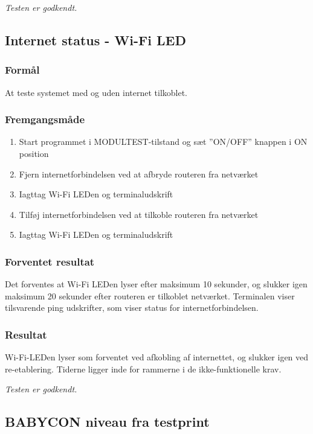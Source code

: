 
\textit{Testen er godkendt.}

\subsection*{Internet status - Wi-Fi LED}

\subsubsection*{Formål}
At teste systemet med og uden internet tilkoblet.

\subsubsection*{Fremgangsmåde}
\begin{enumerate}
\item Start programmet i MODULTEST-tilstand og sæt ''ON/OFF'' knappen i ON position
\item Fjern internetforbindelsen ved at afbryde routeren fra netværket
\item Iagttag Wi-Fi LEDen og terminaludskrift
\item Tilføj internetforbindelsen ved at tilkoble routeren fra netværket
\item Iagttag Wi-Fi LEDen og terminaludskrift
\end{enumerate}

\subsubsection*{Forventet resultat} 
Det forventes at Wi-Fi LEDen lyser efter maksimum 10 sekunder, og slukker igen maksimum 20 sekunder efter routeren er tilkoblet netværket. Terminalen viser tilsvarende ping udskrifter, som viser status for internetforbindelsen.

\subsubsection*{Resultat} 
Wi-Fi-LEDen lyser som forventet ved afkobling af internettet, og slukker igen ved re-etablering. Tiderne ligger inde for rammerne i de ikke-funktionelle krav. 

\textit{Testen er godkendt.}

\subsection*{BABYCON niveau fra testprint}

